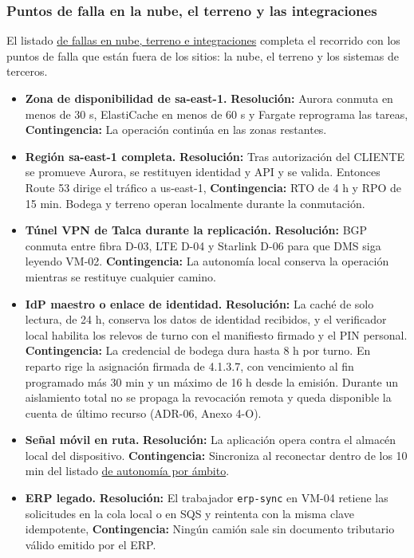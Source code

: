 \subsubsection{Puntos de falla en la nube, el terreno y las integraciones}

El listado \hyperref[tab:fallas-nube]{de fallas en nube, terreno e integraciones} completa el recorrido con los puntos de falla que están fuera de los sitios: la nube, el terreno y los sistemas de terceros.

\label{tab:fallas-nube}
\begin{itemize}
\item \textbf{Zona de disponibilidad de sa-east-1.} \textbf{Resolución:} Aurora conmuta en menos de 30 s, ElastiCache en menos de 60 s y Fargate reprograma las tareas, \textbf{Contingencia:} La operación continúa en las zonas restantes.
\item \textbf{Región sa-east-1 completa.} \textbf{Resolución:} Tras autorización del CLIENTE se promueve Aurora, se restituyen identidad y API y se valida. Entonces Route 53 dirige el tráfico a us-east-1, \textbf{Contingencia:} RTO de 4 h y RPO de 15 min. Bodega y terreno operan localmente durante la conmutación.
\item \textbf{Túnel VPN de Talca durante la replicación.} \textbf{Resolución:} BGP conmuta entre fibra D-03, LTE D-04 y Starlink D-06 para que DMS siga leyendo VM-02. \textbf{Contingencia:} La autonomía local conserva la operación mientras se restituye cualquier camino.
\item \textbf{IdP maestro o enlace de identidad.} \textbf{Resolución:} La caché de solo lectura, de 24 h, conserva los datos de identidad recibidos, y el verificador local habilita los relevos de turno con el manifiesto firmado y el PIN personal. \textbf{Contingencia:} La credencial de bodega dura hasta 8 h por turno. En reparto rige la asignación firmada de 4.1.3.7, con vencimiento al fin programado más 30 min y un máximo de 16 h desde la emisión. Durante un aislamiento total no se propaga la revocación remota y queda disponible la cuenta de último recurso (ADR-06, Anexo 4-O).
\item \textbf{Señal móvil en ruta.} \textbf{Resolución:} La aplicación opera contra el almacén local del dispositivo. \textbf{Contingencia:} Sincroniza al reconectar dentro de los 10 min del listado \hyperref[tab:t29]{de autonomía por ámbito}.
\item \textbf{ERP legado.} \textbf{Resolución:} El trabajador \texttt{erp-sync} en VM-04 retiene las solicitudes en la cola local o en SQS y reintenta con la misma clave idempotente, \textbf{Contingencia:} Ningún camión sale sin documento tributario válido emitido por el ERP.

\end{itemize}

